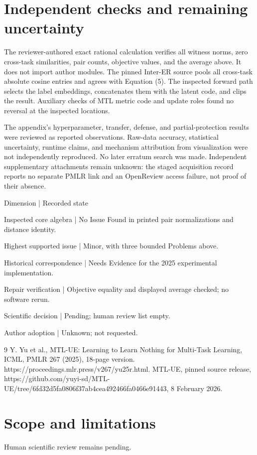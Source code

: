 \documentclass[10pt]{article}
\begin{document}
\section*{Independent checks and remaining uncertainty}
The reviewer-authored exact rational calculation verifies all witness norms, zero cross-task similarities, pair counts, objective values, and the average above. It does not import author modules. The pinned Inter-ER source pools all cross-task absolute cosine entries and agrees with Equation (5). The inspected forward path selects the label embeddings, concatenates them with the latent code, and clips the result. Auxiliary checks of MTL metric code and update roles found no reversal at the inspected locations.\par
The appendix’s hyperparameter, transfer, defense, and partial-protection results were reviewed as reported observations. Raw-data accuracy, statistical uncertainty, runtime claims, and mechanism attribution from visualization were not independently reproduced. No later erratum search was made. Independent supplementary attachments remain unknown: the staged acquisition record reports no separate PMLR link and an OpenReview access failure, not proof of their absence.\par
Dimension | Recorded state\par
Inspected core algebra | No Issue Found in printed pair normalizations and distance identity.\par
Highest supported issue | Minor, with three bounded Problems above.\par
Historical correspondence | Needs Evidence for the 2025 experimental implementation.\par
Repair verification | Objective equality and displayed average checked; no software rerun.\par
Scientific decision | Pending; human review list empty.\par
Author adoption | Unknown; not requested.\par
9 Y. Yu et al., MTL-UE: Learning to Learn Nothing for Multi-Task Learning, ICML, PMLR 267 (2025), 18-page version. https://proceedings.mlr.press/v267/yu25r.html. MTL-UE, pinned source release, https://github.com/yuyi-sd/MTL-UE/tree/6fd32d5fa0806f37ab4cea492466fa0466e91443, 8 February 2026.\par
\section*{Scope and limitations}
Human scientific review remains pending.\par
\end{document}
